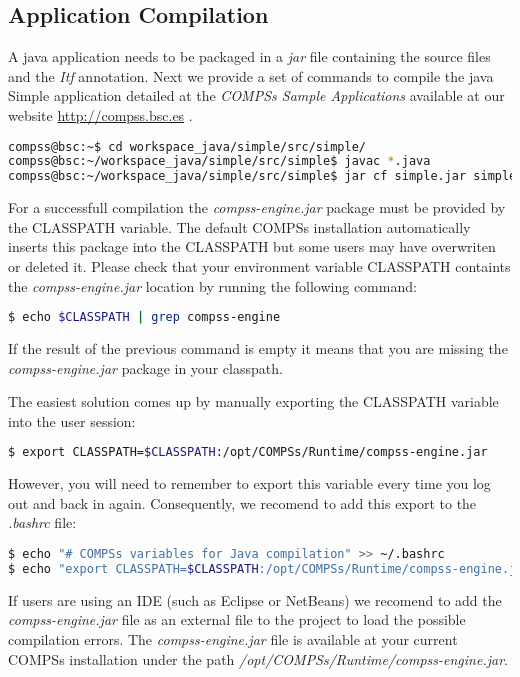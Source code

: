 \begin{itemize}
\subsection{Application Compilation}
A java application needs to be packaged in a \textit{jar} file containing the source files and the \textit{Itf} annotation.
Next we provide a set of commands to compile the java Simple application detailed at the \textit{COMPSs Sample Applications} 
available at our website \url{http://compss.bsc.es} .
\begin{lstlisting}[language=bash]
compss@bsc:~$ cd workspace_java/simple/src/simple/
compss@bsc:~/workspace_java/simple/src/simple$ javac *.java
compss@bsc:~/workspace_java/simple/src/simple$ jar cf simple.jar simple 
\end{lstlisting}

For a successfull compilation the \textit{compss-engine.jar} package must be provided by the CLASSPATH variable. The default COMPSs
installation automatically inserts this package into the CLASSPATH but some users may have overwriten or deleted it. Please check
that your environment variable CLASSPATH containts the \textit{compss-engine.jar} location by running the following command:
\begin{lstlisting}[language=bash]
$ echo $CLASSPATH | grep compss-engine
\end{lstlisting}
If the result of the previous command is empty it means that you are missing the \textit{compss-engine.jar} package in your classpath. 

The easiest solution comes up by manually exporting the CLASSPATH variable into the user session:
\begin{lstlisting}[language=bash]
$ export CLASSPATH=$CLASSPATH:/opt/COMPSs/Runtime/compss-engine.jar
\end{lstlisting}
However, you will need to remember to export this variable every time you log out and back in again. Consequently, we recomend to 
add this export to the \textit{.bashrc} file:
\begin{lstlisting}[language=bash]
$ echo "# COMPSs variables for Java compilation" >> ~/.bashrc
$ echo "export CLASSPATH=$CLASSPATH:/opt/COMPSs/Runtime/compss-engine.jar" >> ~/.bashrc
\end{lstlisting}

If users are using an IDE (such as Eclipse or NetBeans) we recomend to add the \textit{compss-engine.jar} file as an external file 
to the project to load the possible compilation errors. The \textit{compss-engine.jar} file is available at your current 
COMPSs installation under the path \textit{/opt/COMPSs/Runtime/compss-engine.jar}.


\end{itemize}
